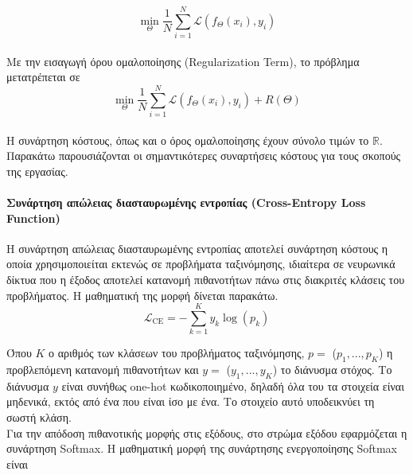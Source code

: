 \documentclass[12pt]{article}
\numberwithin{equation}{section}
\begin{document}
\begin{equation}
\min_{\Theta} \frac{1}{N} \sum_{i=1}^N \mathcal{L}(f_\Theta(x_i), y_i)
\end{equation}\\

\noindent Με την εισαγωγή όρου ομαλοποίησης (Regularization Term), το πρόβλημα μετατρέπεται σε\\

\begin{equation}
\min_{\Theta} \frac{1}{N} \sum_{i=1}^N \mathcal{L}(f_\Theta(x_i), y_i) + R(\Theta)
\end{equation}\\

\noindent Η συνάρτηση κόστους, όπως και ο όρος ομαλοποίησης έχουν σύνολο τιμών το \(\mathbb{R}\). Παρακάτω παρουσιάζονται οι σημαντικότερες συναρτήσεις κόστους για τους σκοπούς της εργασίας. \\

\paragraph{Συνάρτηση απώλειας διασταυρωμένης εντροπίας (Cross-Entropy Loss Function)\\ [0.5 cm]}

Η συνάρτηση απώλειας διασταυρωμένης εντροπίας αποτελεί συνάρτηση κόστους η οποία χρησιμοποιείται εκτενώς σε προβλήματα ταξινόμησης, ιδιαίτερα σε νευρωνικά δίκτυα που η έξοδος αποτελεί κατανομή πιθανοτήτων πάνω στις διακριτές κλάσεις του προβλήματος. Η μαθηματική της μορφή δίνεται παρακάτω. \\

\begin{equation}
\mathcal{L}_{\text{CE}} = - \sum_{k=1}^{K} y_k \log(p_k)
\end{equation}

\noindent Όπου \(K\) ο αριθμός των κλάσεων του προβλήματος ταξινόμησης, \(p =\) (\(p_1,...,p_K\)) η προβλεπόμενη κατανομή πιθανοτήτων και \(y =\) (\(y_1,...,y_K\)) το διάνυσμα στόχος. Το διάνυσμα \(y\) είναι συνήθως one-hot κωδικοποιημένο, δηλαδή όλα του τα στοιχεία είναι μηδενικά, εκτός από ένα που είναι ίσο με ένα. Το στοιχείο αυτό υποδεικνύει τη σωστή κλάση.\\

Για την απόδοση πιθανοτικής μορφής στις εξόδους, στο στρώμα εξόδου εφαρμόζεται η συνάρτηση Softmax. Η μαθηματική μορφή της συνάρτησης ενεργοποίησης Softmax είναι\\
\end{document}
